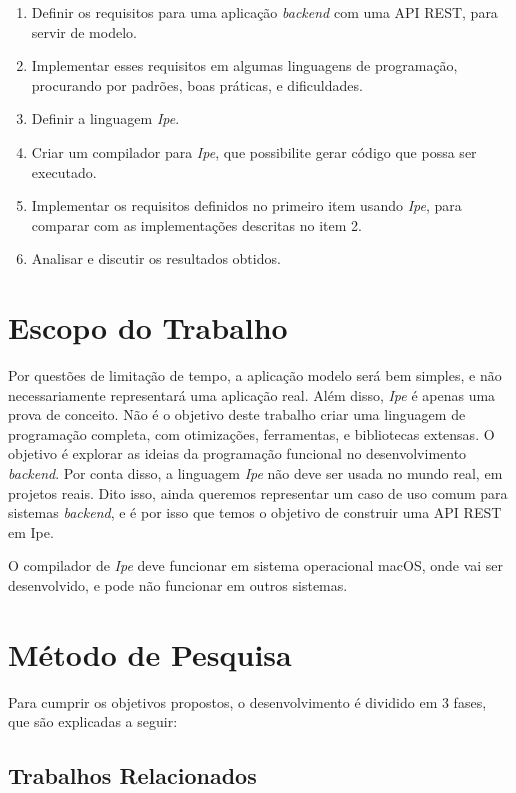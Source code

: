 \begin{enumerate}
      \item Definir os requisitos para uma aplicação \textit{backend} com uma API
            REST, para servir de modelo.
      \item Implementar esses requisitos em algumas linguagens de programação,
            procurando por padrões, boas práticas, e dificuldades.
      \item Definir a linguagem \textit{Ipe}.
      \item Criar um compilador para \textit{Ipe}, que possibilite gerar código
            que possa ser executado.
      \item Implementar os requisitos definidos no primeiro item usando \textit{Ipe},
            para comparar com as implementações descritas no item 2.
      \item Analisar e discutir os resultados obtidos.
\end{enumerate}


\section{Escopo do Trabalho}

Por questões de limitação de tempo, a aplicação modelo será bem simples, e não
necessariamente representará uma aplicação real. Além disso, \textit{Ipe} é apenas
uma prova de conceito. Não é o objetivo deste trabalho criar uma linguagem de
programação completa, com otimizações, ferramentas, e bibliotecas extensas. O
objetivo é explorar as ideias da programação funcional no desenvolvimento
\textit{backend}. Por conta disso, a linguagem \textit{Ipe} não deve ser usada
no mundo real, em projetos reais. Dito isso, ainda queremos representar um caso
de uso comum para sistemas \textit{backend}, e é por isso que temos o objetivo
de construir uma API REST em Ipe.

O compilador de \textit{Ipe} deve funcionar em sistema operacional macOS, onde
vai ser desenvolvido, e pode não funcionar em outros sistemas.

\section{Método de Pesquisa}

Para cumprir os objetivos propostos, o desenvolvimento é dividido em 3 fases, que
são explicadas a seguir:

\subsection{Trabalhos Relacionados}

